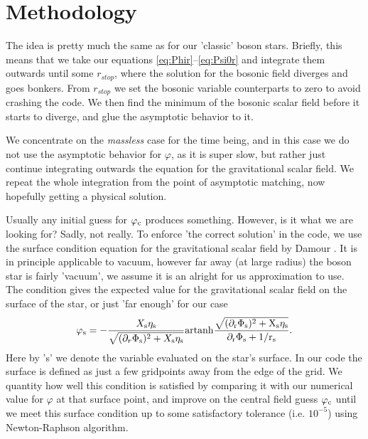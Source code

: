 \documentclass[12pt]{article}
\numberwithin{equation}{section}
\newcounter{count}
\begin{document}
\section{Methodology}
The idea is pretty much the same as for our 'classic' boson stars. Briefly, this means that we take our equations \eqref{eq:Phir}--\eqref{eq:Psi0r} and integrate them outwards until some $r_{stop}$, where the solution for the bosonic field diverges and goes bonkers. From $r_{stop}$ we set the bosonic variable counterparts to zero to avoid crashing the code. We then find the minimum of the bosonic scalar field before it starts to diverge, and glue the asymptotic behavior to it. 

We concentrate on the \textit{massless} case for the time being, and in this case we do not use the asymptotic behavior for $\varphi$, as it is super slow, but rather just continue integrating outwards the equation for the gravitational scalar field. We repeat the whole integration from the point of asymptotic matching, now hopefully getting a physical solution. 

Usually any initial guess for $\varphi_{\rm{c}}$ produces something. However, is it what we are looking for? Sadly, not really. To enforce 'the correct solution' in the code, we use the surface condition equation for the gravitational scalar field by Damour \cite{Damour:1993hw, Gerosa:2016fri}. It is in principle applicable to vacuum, however far away (at large radius) the boson star is fairly 'vacuum', we assume it is an alright for us approximation to use. The condition gives the expected value for the gravitational scalar field on the surface of the star, or just 'far enough' for our case
\begin{equation}
    \varphi_{\rm{s}} = - \frac{X_{\rm{s}} \eta_{\rm{s}}}{\sqrt{(\partial_r \Phi_{\rm{s}})^2 + X_{\rm{s}} \eta_{\rm{s}}}} \rm{artanh} \frac{\sqrt{(\partial_r \Phi_{\rm{s}})^2 + X_{\rm{s}} \eta_{\rm{s}}}}{\partial_r \Phi_{\rm{s}} + 1/r_{\rm{s}}}.
\end{equation}
Here by 's' we denote the variable evaluated on the star's surface. In our code the surface is defined as just a few gridpoints away from the edge of the grid. We quantity how well this condition is satisfied by comparing it with our numerical value for $\varphi$ at that surface point, and improve on the central field guess $\varphi_{\rm{c}}$ until we meet this surface condition up to some satisfactory tolerance (i.e. $10^{-5}$) using Newton-Raphson algorithm.
\end{document}
